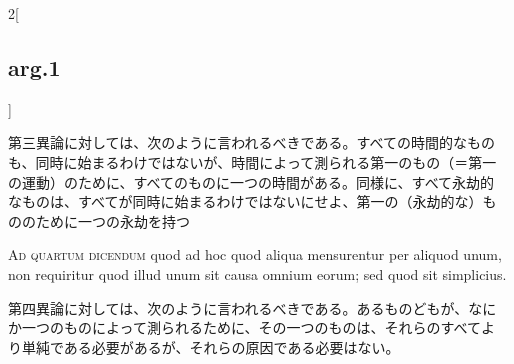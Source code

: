 \documentclass[paper=a4paper,fontsize=10pt,jafontsize=9pt,titlepage]{jlreq}
\begin{document}
\begin{paracol}{2}[\subsection{arg.1}]
\switchcolumn

第三異論に対しては、次のように言われるべきである。すべての時間的なもの
も、同時に始まるわけではないが、時間によって測られる第一のもの（＝第一
の運動）のために、すべてのものに一つの時間がある。同様に、すべて永劫的
なものは、すべてが同時に始まるわけではないにせよ、第一の（永劫的な）も
ののために一つの永劫を持つ

\switchcolumn*[\subsection{ad.4}]

{\scshape Ad quartum dicendum} quod ad hoc quod aliqua mensurentur per aliquod
unum, non requiritur quod illud unum sit causa omnium eorum; sed quod
sit simplicius.

\switchcolumn

第四異論に対しては、次のように言われるべきである。あるものどもが、なに
か一つのものによって測られるために、その一つのものは、それらのすべてよ
り単純である必要があるが、それらの原因である必要はない。

\end{paracol}
\end{document}
